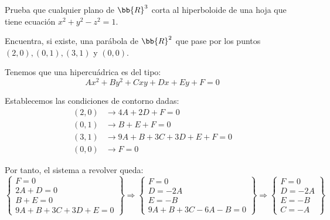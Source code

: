 \begin{ejercicio}
    Prueba que cualquier plano de $\bb{R}^3$ corta al hiperboloide de una hoja que tiene ecuación $x^2+y^2-z^2 = 1$.
\end{ejercicio}



\begin{ejercicio}
    Encuentra, si existe, una parábola de $\bb{R}^2$ que pase por los puntos $(2, 0), (0, 1), (3, 1)$ y $(0, 0)$.

    Tenemos que una hipercuádrica es del tipo:
    \begin{equation*}
        Ax^2+By^2+Cxy+Dx+Ey+F=0
    \end{equation*}

    Establecemos las condiciones de contorno dadas:
    \begin{equation*}
        \begin{split}
            (2,0)&\longrightarrow 4A+2D+F=0\\
            (0,1)&\longrightarrow B+E+F=0\\
            (3,1)&\longrightarrow 9A+B+3C+3D+E+F=0\\
            (0,0)&\longrightarrow F=0
        \end{split}
    \end{equation*}

    Por tanto, el sistema a revolver queda:
    \begin{equation*}
        \left\{\begin{array}{l}
            F=0\\
            2A+D=0 \\
            B+E=0\\
            9A+B+3C+3D+E=0
        \end{array}\right\}
        \Longrightarrow
        \left\{\begin{array}{l}
            F=0\\
            D=-2A \\
            E=-B\\
            9A+B+3C-6A-B=0
        \end{array}\right\}
        \Longrightarrow
        \left\{\begin{array}{l}
            F=0\\
            D=-2A \\
            E=-B\\
            C=-A
        \end{array}\right\}
    \end{equation*}


\end{ejercicio}
